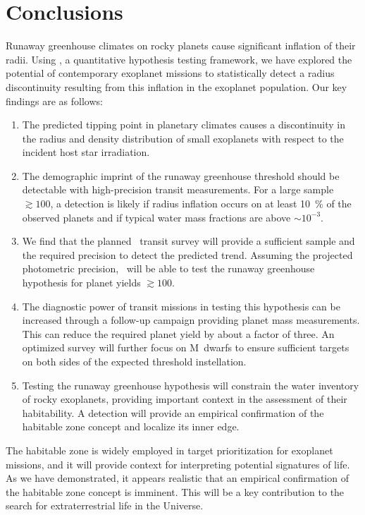 \documentclass[modern]{aastex631}
\begin{document}
\section{Conclusions}

Runaway greenhouse climates on rocky planets cause significant inflation of their radii.
Using \bioverse, a quantitative hypothesis testing framework, we have explored the potential of contemporary exoplanet missions to statistically detect a radius discontinuity resulting from this inflation in the exoplanet population.
Our key findings are as follows:
\begin{enumerate}
    \item The predicted tipping point in planetary climates causes a discontinuity in the radius and density distribution of small exoplanets with respect to the incident host star irradiation.
    \item The demographic imprint of the runaway greenhouse threshold should be detectable with high-precision transit measurements. For a large sample $\gtrsim 100$, a detection is likely if radius inflation occurs on at least \SI{10}{\percent} of the observed planets and if typical water mass fractions are above $\sim 10^{-3}$.
    \item We find that the planned \plato\ transit survey will provide a sufficient sample and the required precision to detect the predicted trend. Assuming the projected photometric precision, \plato\ will be able to test the runaway greenhouse hypothesis for planet yields $\gtrsim 100$.
    \item The diagnostic power of transit missions in testing this hypothesis can be increased through a follow-up campaign providing planet mass measurements. This can reduce the required planet yield by about a factor of three.  An optimized survey will further focus on M~dwarfs to ensure sufficient targets on both sides of the expected threshold instellation.
    \item Testing the runaway greenhouse hypothesis will constrain the water inventory of rocky exoplanets, providing important context in the assessment of their habitability.
         A detection will provide an empirical confirmation of the habitable zone concept and localize its inner edge.

\end{enumerate}

The habitable zone is widely employed in target prioritization for exoplanet missions, and it will provide context for interpreting potential signatures of life.
As we have demonstrated, it appears realistic that an empirical confirmation of the habitable zone concept is imminent.
This will be a key contribution to the search for extraterrestrial life in the Universe.
\end{document}
